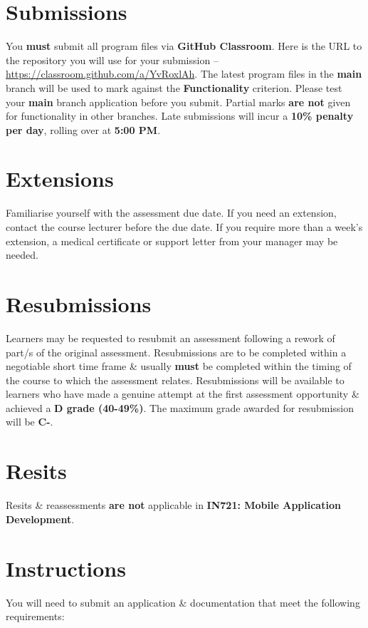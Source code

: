 \documentclass{article}
\begin{document}
\section*{Submissions}
You \textbf{must} submit all program files via \textbf{GitHub Classroom}. Here is the URL to the repository you will use for your submission – \href{https://classroom.github.com/a/YvRoxlAh}{https://classroom.github.com/a/YvRoxlAh}. The latest program files in the \textbf{main} branch will be used to mark against the \textbf{Functionality} criterion. Please test your \textbf{main} branch application before you submit. Partial marks \textbf{are not} given for functionality in other branches. Late submissions will incur a \textbf{10\% penalty per day}, rolling over at \textbf{5:00 PM}.

\section*{Extensions}
Familiarise yourself with the assessment due date. If you need an extension, contact the course lecturer before the due date. If you require more than a week's extension, a medical certificate or support letter from your manager may be needed.

\section*{Resubmissions}
Learners may be requested to resubmit an assessment following a rework of part/s of the original assessment. Resubmissions are to be completed within a negotiable short time frame \& usually \textbf{must} be completed within the timing of the course to which the assessment relates. Resubmissions will be available to learners who have made a genuine attempt at the first assessment opportunity \& achieved a \textbf{D grade (40-49\%)}. The maximum grade awarded for resubmission will be \textbf{C-}.

\section*{Resits}
Resits \& reassessments \textbf{are not} applicable in \textbf{IN721: Mobile Application Development}. 

\section*{Instructions}
You will need to submit an application \& documentation that meet the following requirements:
\end{document}
